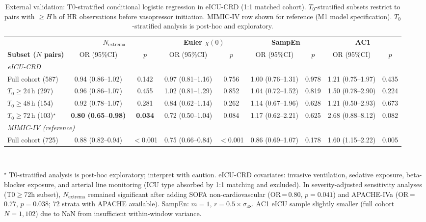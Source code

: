 \documentclass[12pt,a4paper]{article}
\begin{document}
\begin{table}
\centering
\caption{External validation: T0-stratified conditional logistic regression
in eICU-CRD (1:1 matched cohort).
$T_0$-stratified subsets restrict to pairs with $\geq H$\,h of HR
observations before vasopressor initiation.
MIMIC-IV row shown for reference (M1 model specification).
$T_0$-stratified analysis is post-hoc and exploratory.}
\label{tab:eicu}
\small
\begin{tabular}{lcccccccc}
\toprule
& \multicolumn{2}{c}{\textbf{$N_{\text{extrema}}$}}
& \multicolumn{2}{c}{\textbf{Euler $\chi(0)$}}
& \multicolumn{2}{c}{\textbf{SampEn}}
& \multicolumn{2}{c}{\textbf{AC1}} \\
\cmidrule(lr){2-3}\cmidrule(lr){4-5}\cmidrule(lr){6-7}\cmidrule(lr){8-9}
\textbf{Subset ($N$ pairs)} & OR (95\%CI) & $p$ & OR (95\%CI) & $p$
& OR (95\%CI) & $p$ & OR (95\%CI) & $p$ \\
\midrule
\multicolumn{9}{l}{\textit{eICU-CRD}} \\
Full cohort (587)  & 0.94 (0.86--1.02) & 0.142 & 0.97 (0.81--1.16) & 0.756 & 1.00 (0.76--1.31) & 0.978 & 1.21 (0.75--1.97) & 0.435 \\
$T_0\geq 24$\,h (297) & 0.96 (0.86--1.07) & 0.455 & 1.02 (0.81--1.29) & 0.852 & 1.04 (0.72--1.52) & 0.819 & 1.50 (0.78--2.90) & 0.224 \\
$T_0\geq 48$\,h (154) & 0.92 (0.78--1.07) & 0.281 & 0.84 (0.62--1.14) & 0.262 & 1.14 (0.67--1.96) & 0.628 & 1.21 (0.50--2.93) & 0.673 \\
$T_0\geq 72$\,h (103)$^\star$ & \textbf{0.80 (0.65--0.98)} & \textbf{0.034} & 0.72 (0.50--1.04) & 0.084 & 1.17 (0.62--2.21) & 0.625 & 2.68 (0.88--8.12) & 0.082 \\
\midrule
\multicolumn{9}{l}{\textit{MIMIC-IV (reference)}} \\
Full cohort (725) & 0.88 (0.82--0.94) & $<$0.001 & 0.75 (0.66--0.84) & $<$0.001 & 0.86 (0.69--1.07) & 0.178 & 1.60 (1.15--2.22) & 0.005 \\
\bottomrule
\end{tabular}
\vspace{2pt}\\
\raggedright
\footnotesize $^\star$ T0-stratified analysis is post-hoc exploratory; interpret with caution.
eICU-CRD covariates: invasive ventilation, sedative exposure, beta-blocker exposure,
and arterial line monitoring (ICU type absorbed by 1:1 matching and excluded).
In severity-adjusted sensitivity analyses (T0$\geq$72h subset), $N_{\text{extrema}}$
remained significant after adding SOFA non-cardiovascular (OR\,=\,0.80, $p=0.041$)
and APACHE-IVa (OR\,=\,0.77, $p=0.038$; 72 strata with APACHE available).
SampEn: $m=1$, $r=0.5\times\sigma_{48}$. AC1 eICU sample slightly smaller
(full cohort $N=1{,}102$) due to NaN from insufficient within-window variance.
\end{table}
\end{document}

